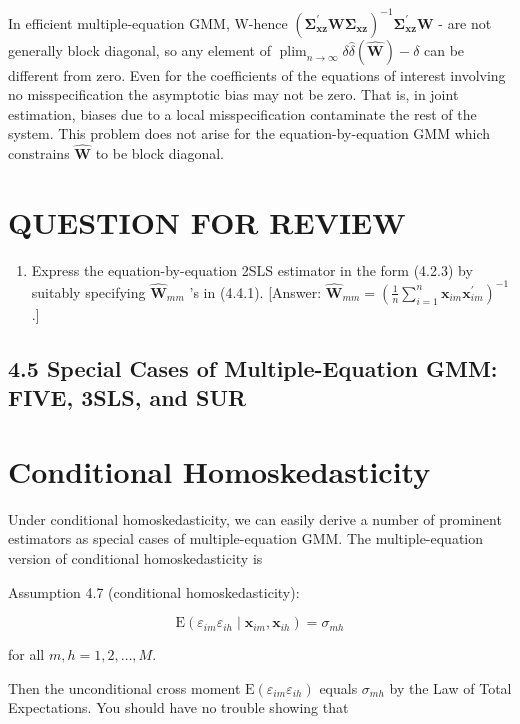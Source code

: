 \documentclass[10pt]{article}
\begin{document}
In efficient multiple-equation GMM, W-hence $\left(\boldsymbol{\Sigma}_{\mathbf{x z}}^{\prime} \mathbf{W} \boldsymbol{\Sigma}_{\mathbf{x z}}\right)^{-1} \boldsymbol{\Sigma}_{\mathbf{x z}}^{\prime} \mathbf{W}$ - are not generally block diagonal, so any element of $\operatorname{plim}_{n \rightarrow \infty} \delta \hat{\delta}(\widehat{\mathbf{W}})-\delta$ can be different from zero. Even for the coefficients of the equations of interest involving no misspecification the asymptotic bias may not be zero. That is, in joint estimation, biases due to a local misspecification contaminate the rest of the system. This problem does not arise for the equation-by-equation GMM which constrains $\widehat{\mathbf{W}}$ to be block diagonal.

\section*{QUESTION FOR REVIEW}
\begin{enumerate}
  \item Express the equation-by-equation 2SLS estimator in the form (4.2.3) by suitably specifying $\widehat{\mathbf{W}}_{m m}$ 's in (4.4.1). [Answer: $\widehat{\mathbf{W}}_{m m}=\left(\frac{1}{n} \sum_{i=1}^{n} \mathbf{x}_{i m} \mathbf{x}_{i m}^{\prime}\right)^{-1}$.]
\end{enumerate}

\subsection*{4.5 Special Cases of Multiple-Equation GMM: FIVE, 3SLS, and SUR}
\section*{Conditional Homoskedasticity}
Under conditional homoskedasticity, we can easily derive a number of prominent estimators as special cases of multiple-equation GMM. The multiple-equation version of conditional homoskedasticity is

Assumption 4.7 (conditional homoskedasticity):

$$
\mathrm{E}\left(\varepsilon_{i m} \varepsilon_{i h} \mid \mathbf{x}_{i m}, \mathbf{x}_{i h}\right)=\sigma_{m h}
$$

for all $m, h=1,2, \ldots, M$.

Then the unconditional cross moment $\mathrm{E}\left(\varepsilon_{i m} \varepsilon_{i h}\right)$ equals $\sigma_{m h}$ by the Law of Total Expectations. You should have no trouble showing that
\end{document}
